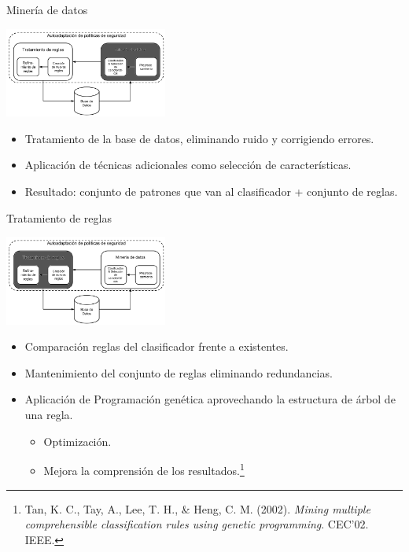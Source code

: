 \documentclass{beamer}
\begin{document}
\begin{frame}{Minería de datos}

\begin{center}
\includegraphics[width=0.4\textwidth]{./imgs/KRS1.png}
\end{center}

\begin{itemize}
  \item<1-> Tratamiento de la base de datos, eliminando ruido y corrigiendo errores.
  \item<2-> Aplicación de técnicas adicionales como selección de características.
  \item<3-> Resultado: conjunto de patrones que van al clasificador + conjunto de reglas.
\end{itemize}

\end{frame}

\begin{frame}{Tratamiento de reglas}

\begin{center}
\includegraphics[width=0.4\textwidth]{./imgs/KRS2.png}
\end{center}

\begin{itemize}
  \item<1-> Comparación reglas del clasificador frente a existentes.
  \item<2-> Mantenimiento del conjunto de reglas eliminando redundancias.
  \item<3-> Aplicación de Programación genética aprovechando la estructura de árbol de una regla.
  \begin{itemize}
    \item<3-> Optimización.
    \item<3-> Mejora la comprensión de los resultados.\footnote{Tan, K. C., Tay, A., Lee, T. H., \& Heng, C. M. (2002). \textit{Mining multiple comprehensible classification rules using genetic programming}. CEC'02. IEEE.}
  \end{itemize}
\end{itemize}

\end{frame}
\end{document}
